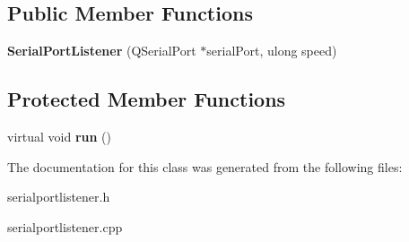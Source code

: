 \subsection*{Public Member Functions}
\begin{DoxyCompactItemize}
\item 
{\bfseries Serial\+Port\+Listener} (Q\+Serial\+Port $\ast$serial\+Port, ulong speed)\hypertarget{class_serial_port_listener_a8a7f2051e1a51ef6a0215ed5b4bc4b6f}{}\label{class_serial_port_listener_a8a7f2051e1a51ef6a0215ed5b4bc4b6f}

\end{DoxyCompactItemize}
\subsection*{Protected Member Functions}
\begin{DoxyCompactItemize}
\item 
virtual void {\bfseries run} ()\hypertarget{class_serial_port_listener_a5dd9c170cb3c1fa515339bcecba9a692}{}\label{class_serial_port_listener_a5dd9c170cb3c1fa515339bcecba9a692}

\end{DoxyCompactItemize}


The documentation for this class was generated from the following files\+:\begin{DoxyCompactItemize}
\item 
serialportlistener.\+h\item 
serialportlistener.\+cpp\end{DoxyCompactItemize}
